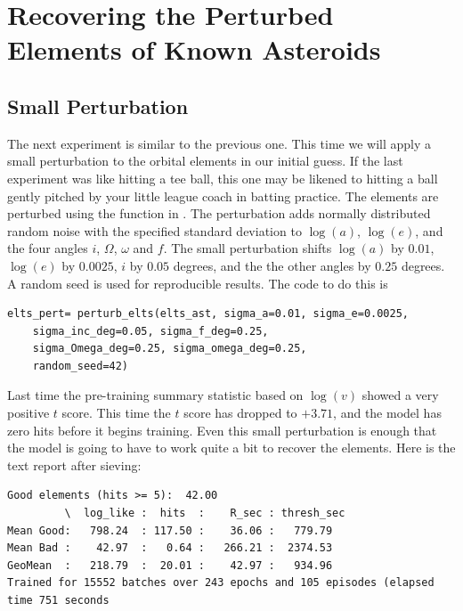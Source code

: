 \section{Recovering the Perturbed Elements of Known Asteroids}
\label{section_results_known_ast_perturbed}

\subsection{Small Perturbation}
The next experiment is similar to the previous one.
This time we will apply a small perturbation to the orbital elements in our initial guess.
If the last experiment was like hitting a tee ball, this one may be likened to hitting a ball gently pitched by your little league coach in batting practice.
The elements are perturbed using the function  in .
The perturbation adds normally distributed random noise with the specified standard deviation
to $\log(a)$, $\log(e)$, and the four angles $i$, $\Omega$, $\omega$ and $f$.
The small perturbation shifts $\log(a)$ by $0.01$, $\log(e)$ by $0.0025$, $i$ by $0.05$ degrees,
and the the other angles by $0.25$ degrees.
A random seed is used for reproducible results.
The code to do this is
\begin{lstlisting}[style=CodeSnippet]
elts_pert= perturb_elts(elts_ast, sigma_a=0.01, sigma_e=0.0025, 
	sigma_inc_deg=0.05, sigma_f_deg=0.25, 
	sigma_Omega_deg=0.25, sigma_omega_deg=0.25,
	random_seed=42)
\end{lstlisting}
Last time the pre-training summary statistic based on $\log(v)$ showed a very positive $t$ score.
This time the $t$ score has dropped to $+3.71$, and the model has zero hits before it begins training.
Even this small perturbation is enough that the model is going to have to work quite a bit to recover the elements.
Here is the text report after sieving:
\begin{lstlisting}[style=CodeSnippet]
Good elements (hits >= 5):  42.00
         \  log_like :  hits  :    R_sec : thresh_sec
Mean Good:   798.24  : 117.50 :    36.06 :   779.79
Mean Bad :    42.97  :   0.64 :   266.21 :  2374.53
GeoMean  :   218.79  :  20.01 :    42.97 :   934.96
Trained for 15552 batches over 243 epochs and 105 episodes (elapsed time 751 seconds
\end{lstlisting}

